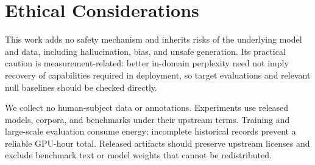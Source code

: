 \section*{Ethical Considerations}

This work adds no safety mechanism and inherits risks of the underlying model
and data, including hallucination, bias, and unsafe generation. Its practical
caution is measurement-related: better in-domain perplexity need not imply
recovery of capabilities required in deployment, so target evaluations and
relevant null baselines should be checked directly.

We collect no human-subject data or annotations. Experiments use released
models, corpora, and benchmarks under their upstream terms. Training and
large-scale evaluation consume energy; incomplete historical records prevent a
reliable GPU-hour total. Released artifacts should preserve upstream licenses
and exclude benchmark text or model weights that cannot be redistributed.
